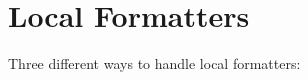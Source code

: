 \documentclass{article}
\begin{document}
\section*{Local Formatters}

Three different ways to handle local formatters:

\toolbar \par
{} \par
{}
\end{document}
